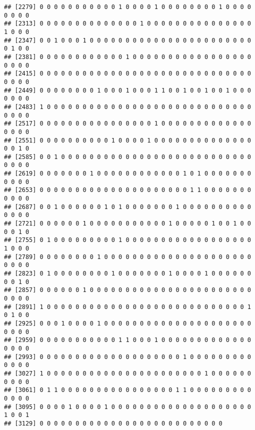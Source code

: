 \documentclass[]{article}
\newenvironment{Shaded}{\begin{snugshade}}{\end{snugshade}}
\newcommand{\KeywordTok}[1]{\textcolor[rgb]{0.13,0.29,0.53}{\textbf{#1}}}
\newcommand{\StringTok}[1]{\textcolor[rgb]{0.31,0.60,0.02}{#1}}
\newcommand{\OperatorTok}[1]{\textcolor[rgb]{0.81,0.36,0.00}{\textbf{#1}}}
\newcommand{\NormalTok}[1]{#1}
\begin{document}
\begin{verbatim}
## [2279] 0 0 0 0 0 0 0 0 0 0 0 1 0 0 0 0 1 0 0 0 0 0 0 0 0 1 0 0 0 0 0 0 0 0
## [2313] 0 0 0 0 0 0 0 0 0 0 0 0 0 0 1 0 0 0 0 0 0 0 0 0 0 0 0 0 0 0 1 0 0 0
## [2347] 0 0 1 0 0 0 1 0 0 0 0 0 0 0 0 0 0 0 0 0 0 0 0 0 0 0 0 0 0 0 0 1 0 0
## [2381] 0 0 0 0 0 0 0 0 0 0 0 0 1 0 0 0 0 0 0 0 0 0 0 0 0 0 0 0 0 0 0 0 0 0
## [2415] 0 0 0 0 0 0 0 0 0 0 0 0 0 0 0 0 0 0 0 0 0 0 0 0 0 0 0 0 0 0 0 0 0 0
## [2449] 0 0 0 0 0 0 0 0 1 0 0 0 1 0 0 0 1 1 0 0 1 0 0 1 0 0 1 0 0 0 0 0 0 0
## [2483] 1 0 0 0 0 0 0 0 0 0 0 0 0 0 0 0 0 0 0 0 0 0 0 0 0 0 0 0 0 0 0 0 0 0
## [2517] 0 0 0 0 0 0 0 0 0 0 0 0 0 0 0 0 1 0 0 0 0 0 0 0 0 0 0 0 0 0 0 0 0 0
## [2551] 0 0 0 0 0 0 0 0 0 0 1 0 0 0 0 1 0 0 0 0 0 0 0 0 0 0 0 0 0 0 0 0 1 0
## [2585] 0 0 1 0 0 0 0 0 0 0 0 0 0 0 0 0 0 0 0 0 0 0 0 0 0 0 0 0 0 0 0 0 0 0
## [2619] 0 0 0 0 0 0 0 1 0 0 0 0 0 0 0 0 0 0 0 0 1 0 1 0 0 0 0 0 0 0 0 0 0 0
## [2653] 0 0 0 0 0 0 0 0 0 0 0 0 0 0 0 0 0 0 0 0 0 1 1 0 0 0 0 0 0 0 0 0 0 0
## [2687] 0 0 1 0 0 0 0 0 0 1 0 1 0 0 0 0 0 0 0 1 0 0 0 0 0 0 0 0 0 0 0 0 0 0
## [2721] 0 0 0 0 0 0 1 0 0 0 0 0 0 0 0 0 0 0 1 0 0 0 0 0 1 0 0 1 0 0 0 0 1 0
## [2755] 0 1 0 0 0 0 0 0 0 0 0 1 0 0 0 0 0 0 0 0 0 0 0 0 0 0 0 0 0 0 1 0 0 0
## [2789] 0 0 0 0 0 0 0 0 1 0 0 0 0 0 0 0 0 0 0 0 0 0 0 0 0 0 0 0 0 0 0 0 0 0
## [2823] 0 1 0 0 0 0 0 0 0 0 1 0 0 0 0 0 0 0 1 0 0 0 0 1 0 0 0 0 0 0 0 0 1 0
## [2857] 0 0 0 0 0 0 1 0 0 0 0 0 0 0 0 0 0 0 0 0 0 0 0 0 0 0 0 0 0 0 0 0 0 0
## [2891] 1 0 0 0 0 0 0 0 0 0 0 0 0 0 0 0 0 0 0 0 0 0 0 0 0 0 0 0 0 1 0 1 0 0
## [2925] 0 0 0 1 0 0 0 0 1 0 0 0 0 0 0 0 0 0 0 0 0 0 0 0 0 0 0 0 0 0 0 0 0 0
## [2959] 0 0 0 0 0 0 0 0 0 0 0 1 1 0 0 0 1 0 0 0 0 0 0 0 0 0 0 0 0 0 0 0 0 0
## [2993] 0 0 0 0 0 0 0 0 0 0 0 0 0 0 0 0 0 0 0 0 1 0 0 0 0 0 0 0 0 0 0 0 0 0
## [3027] 1 0 0 0 0 0 0 0 0 0 0 0 0 0 0 0 0 0 0 0 0 0 0 1 0 0 0 0 0 0 0 0 0 0
## [3061] 0 1 1 0 0 0 0 0 0 0 0 0 0 0 0 0 0 0 0 1 1 0 0 0 0 0 0 0 0 0 0 0 0 0
## [3095] 0 0 0 0 1 0 0 0 0 1 0 0 0 0 0 0 0 0 0 0 0 0 0 0 0 0 0 0 0 0 1 0 0 1
## [3129] 0 0 0 0 0 0 0 0 0 0 0 0 0 0 0 0 0 0 0 0 0 0 0 0 0 0
\end{verbatim}

\begin{Shaded}
\end{Shaded}
\end{document}
